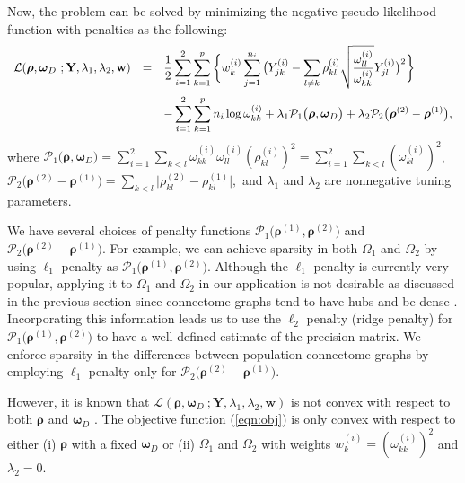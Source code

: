 \documentclass[useAMS,usenatbib,referee]{bio}
\newcommand{\bs}{\boldsymbol}
\begin{document}
{Now, the problem can be solved by minimizing the negative pseudo likelihood function with penalties as the following:
\begin{equation} \label{eqn:obj}
\begin{array}{lll}  \medskip
{\mathcal L}(\bs{\rho},\bs{\omega}_D~;\mathbf{Y},\lambda_1,\lambda_2,\mathbf{w}) &=& \displaystyle
 \frac{1}{2} \sum_{i=1}^2 \sum_{k=1}^p \bigg\{w^{(i)}_{k} \sum_{j=1}^{n_i} \big(Y_{jk}^{(i)} -  \sum_{l \neq k} \rho^{(i)}_{kl} \sqrt{\frac{\omega^{(i)}_{ll}}{\omega^{(i)}_{kk}}} Y_{jl}^{(i)} \big)^2 \bigg\}  \\
&& \displaystyle 
 -\sum_{i=1}^2 \sum_{k=1}^p n_i \log \omega^{(i)}_{kk} 
+ \lambda_1 \mathcal{P}_1\big( \bs{\rho},\bs{\omega}_D \big) + \lambda_2 \mathcal{P}_2 \big(
 \bs{\rho}^{(2)} - \bs{\rho}^{(1)} \big),
\end{array}
\end{equation}
where $\mathcal{P}_1\big( \bs{\rho},\bs{\omega}_D \big)=\sum_{i=1}^2 \sum_{k<l} \omega^{(i)}_{kk}\omega^{(i)}_{ll}(\rho^{(i)}_{kl})^2 = \sum_{i=1}^2 \sum_{k<l} (\omega^{(i)}_{kl})^2$,
 $ \mathcal{P}_2 \big( \bs{\rho}^{(2)} - \bs{\rho}^{(1)} \big)= \sum_{k<l} \big| \rho^{(2)}_{kl} - \rho^{(1)}_{kl} \big|,$
and  $\lambda_1$ and $\lambda_2$ are nonnegative tuning parameters.

We have several choices of penalty functions  $\mathcal{P}_1\big( \bs{\rho}^{(1)},\bs{\rho}^{(2)} \big)$ and $\mathcal{P}_2 \big(\bs{\rho}^{(2)} - \bs{\rho}^{(1)} \big)$. 
For example, we can achieve sparsity in both $\Omega_1$ and $\Omega_2$ by using $\ell_1$ penalty as $\mathcal{P}_1\big( \bs{\rho}^{(1)},\bs{\rho}^{(2)} \big)$.
Although the $\ell_1$ penalty is currently very popular, applying it to  $\Omega_1$ and $\Omega_2$  in our application is not desirable as discussed in the previous section since connectome graphs tend to have hubs and be dense \citep{Ryali2012}. Incorporating this information leads us to use the $\ell_2$ penalty (ridge penalty) for $\mathcal{P}_1\big( \bs{\rho}^{(1)},\bs{\rho}^{(2)} \big)$ to have a well-defined estimate of the precision matrix. We enforce sparsity in the differences between population connectome graphs by employing $\ell_1$ penalty only for $\mathcal{P}_2 \big(
\bs{\rho}^{(2)} - \bs{\rho}^{(1)} \big)$.

However, it is known that ${\mathcal L}(\bs{\rho},\bs{\omega}_D~;\mathbf{Y},\lambda_1,\lambda_2,\mathbf{w})$ is not convex with respect to both $\bs{\rho}$ and $\bs{\omega}_D$ \citep{Khare2014}.
The objective function (\ref{eqn:obj}) is only convex with respect to either 
(i) $\bs{\rho}$ with a fixed $\bs{\omega}_D$ or (ii) $\Omega_1$ and $\Omega_2$ 
with weights $w_{k}^{(i)} = (\omega^{(i)}_{kk})^2$ and $\lambda_2=0$. 

}
\end{document}
